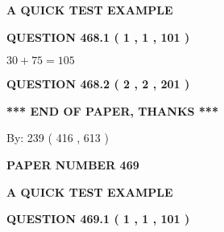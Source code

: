 \documentclass[12pt]{article}
\begin{document}
   
\vspace{0.2in}
   
   
   
   
   
   
 \vspace{0.2in}
{\LARGE {\textbf{ A QUICK TEST EXAMPLE}}}
   
   
  
\vspace{0.2in}
  
{\textbf{\Large{QUESTION
468.1 
 ( 1 , 1 , 101 )
}}}
  
  
 
 

$ %
30 +  %
75=   %
105$
 
 
  
\vspace{0.2in}
  
{\textbf{\Large{QUESTION
468.2 
 ( 2 , 2 , 201 )
}}}
  
  
   
   
 \vspace{0.2in}
 
   
   
   
   
\vspace{1.0in} 
{\textbf{\large{ *** END OF PAPER, THANKS *** }}} 
   
   
\hspace{1.0in} By: 
 239 ( 416 ,  613 )
   
   
   
   
\newpage 
\setcounter{page}{ 
   469001 } 
   
   
   
   
 {\textbf{ \Large{ PAPER NUMBER  469  }}}
   
   
\vspace{0.2in}
   
   
   
   
   
   
 \vspace{0.2in}
{\LARGE {\textbf{ A QUICK TEST EXAMPLE}}}
   
   
  
\vspace{0.2in}
  
{\textbf{\Large{QUESTION
469.1 
 ( 1 , 1 , 101 )
}}}
  
\end{document}
